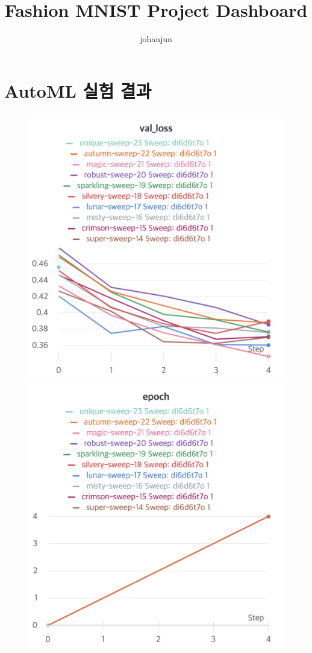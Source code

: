 \documentclass{article}
\title{Fashion MNIST Project Dashboard}
\author{%
johanjun
}
\begin{document}
\maketitle

\section{AutoML 실험 결과}

\begin{figure}[!htb]
\includegraphics[width=\linewidth]{charts/Section-1-Panel-3-18v0j4ssb}
\caption{}
\endminipage\hfill
{}
\includegraphics[width=\linewidth]{charts/Section-1-Panel-4-7rw2mncjq}
\caption{}
\endminipage
\end{figure}
\end{document}
